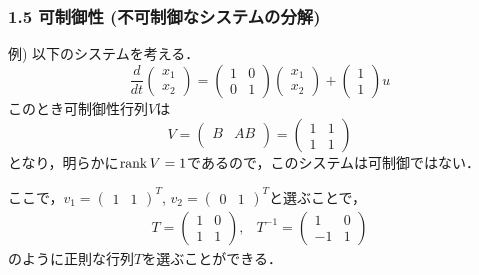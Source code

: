 \begin{frame}[t]
\frametitle{1.5 可制御性 (不可制御なシステムの分解)}
例) 以下のシステムを考える．
\begin{equation}
 \frac{d}{dt}
  \left(
   \begin{array}{c}
    x_1 \\
    x_2
   \end{array}
  \right) =
  \left(
   \begin{array}{cc}
    1 & 0 \\
    0 & 1
   \end{array}
  \right)
  \left(
   \begin{array}{c}
    x_1 \\
    x_2
   \end{array}
  \right) +
  \left(
   \begin{array}{c}
    1 \\
    1
   \end{array}
  \right) u
\end{equation}
このとき可制御性行列$V$は
\begin{equation}
 V =
  \left(
   \begin{array}{cc}
    B & AB\\
   \end{array}
  \right) =
  \left(
   \begin{array}{cc}
    1 & 1 \\
    1 & 1
   \end{array}
  \right)
\end{equation}
となり，明らかに$\mathop{\rm rank}\nolimits V = 1$であるので，このシステムは可制御ではない．

ここで，$v_1 = (\begin{array}{cc}1 & 1\end{array})^T$,
$v_2 = (\begin{array}{cc}0 & 1\end{array})^T$と選ぶことで，
\begin{equation}
 \begin{array}{cc}
  T =
   \left(
    \begin{array}{cc}
     1 & 0 \\
     1 & 1
    \end{array}
   \right),
   &
  T^{-1} =
   \left(
    \begin{array}{cc}
     1 & 0 \\
     -1 & 1
    \end{array}
   \right)
 \end{array}
\end{equation}
のように正則な行列$T$を選ぶことができる．
\end{frame}


